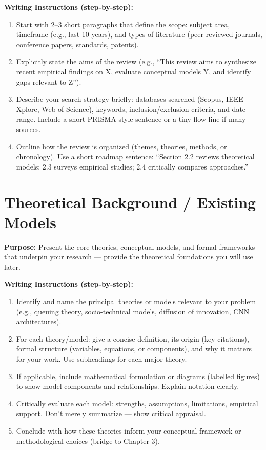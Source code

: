 {\color{red}\textbf{Writing Instructions (step-by-step):}
\begin{enumerate}
    \item Start with 2–3 short paragraphs that define the scope: subject area, timeframe (e.g., last 10 years), and types of literature (peer-reviewed journals, conference papers, standards, patents).
    
    \item Explicitly state the aims of the review (e.g., ``This review aims to synthesize recent empirical findings on X, evaluate conceptual models Y, and identify gaps relevant to Z'').
    
    \item Describe your search strategy briefly: databases searched (Scopus, IEEE Xplore, Web of Science), keywords, inclusion/exclusion criteria, and date range. Include a short PRISMA-style sentence or a tiny flow line if many sources.
    
    \item Outline how the review is organized (themes, theories, methods, or chronology). Use a short roadmap sentence: ``Section 2.2 reviews theoretical models; 2.3 surveys empirical studies; 2.4 critically compares approaches.''
\end{enumerate}}


\section{Theoretical Background / Existing Models}

{\color{blue}\textbf{Purpose:}
Present the core theories, conceptual models, and formal frameworks that underpin your research — provide the theoretical foundations you will use later.} \\

{\color{red}\textbf{Writing Instructions (step-by-step):}
\begin{enumerate}
    \item Identify and name the principal theories or models relevant to your problem (e.g., queuing theory, socio-technical models, diffusion of innovation, CNN architectures).
    
    \item For each theory/model: give a concise definition, its origin (key citations), formal structure (variables, equations, or components), and why it matters for your work. Use subheadings for each major theory.
    
    \item If applicable, include mathematical formulation or diagrams (labelled figures) to show model components and relationships. Explain notation clearly.
    
    \item Critically evaluate each model: strengths, assumptions, limitations, empirical support. Don't merely summarize — show critical appraisal.
    
    \item Conclude with how these theories inform your conceptual framework or methodological choices (bridge to Chapter 3).
\end{enumerate}}



